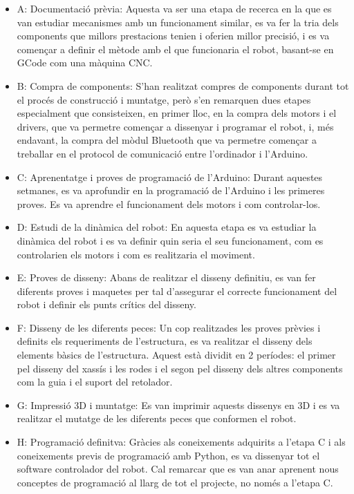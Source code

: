 \begin{itemize}
	\item A: Documentació prèvia: Aquesta va ser una etapa de recerca en la que es van estudiar mecanismes amb un funcionament similar, es va fer la tria dels components que millors prestacions tenien i oferien millor precisió, i es va començar a definir el mètode amb el que funcionaria el robot, basant-se en GCode com una màquina CNC.
	
	\item B: Compra de components: S'han realitzat compres de components durant tot el procés de construcció i muntatge, però s'en remarquen dues etapes especialment que consisteixen, en primer lloc, en la compra dels motors i el drivers, que va permetre començar a dissenyar i programar el robot, i, més endavant, la compra del mòdul Bluetooth que va permetre començar a treballar en el protocol de comunicació entre l'ordinador i l'Arduino. 
	
	\item C: Aprenentatge i proves de programació de l'Arduino: Durant aquestes setmanes, es va aprofundir en la programació de l'Arduino i les primeres proves. Es va aprendre el funcionament dels motors i com controlar-los.
	
	\item D: Estudi de la dinàmica del robot: En aquesta etapa es va estudiar la dinàmica del robot i es va definir quin seria el seu funcionament, com es controlarien els motors i com es realitzaria el moviment. 
	
	\item E: Proves de disseny: Abans de realitzar el disseny definitiu, es van fer diferents proves i maquetes per tal d'assegurar el correcte funcionament del robot i definir els punts crítics del disseny. 
	
	\item F: Disseny de les diferents peces: Un cop realitzades les proves prèvies i definits els requeriments de l'estructura, es va realitzar el disseny dels elements bàsics de l'estructura. Aquest està dividit en 2 períodes: el primer pel disseny del xassís i les rodes i el segon  pel disseny dels altres components com la guia i el suport del retolador.
	
	\item G: Impressió 3D i muntatge: Es van imprimir aquests dissenys en 3D i es va realitzar el mutatge de les diferents peces que conformen el robot. 
	
	\item H: Programació definitva: Gràcies als coneixements adquirits a l'etapa C i als coneixements previs de programació amb Python, es va dissenyar tot el software controlador del robot. Cal remarcar que es van anar aprenent nous conceptes de programació al llarg de tot el projecte, no només a l'etapa C.
	

\end{itemize}
